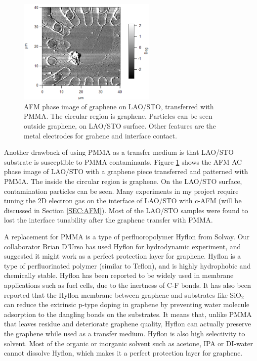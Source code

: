 \documentclass[pdflatex, sectionletters, 12pt]{pittetd}    %
\begin{document}
\begin{figure}[h!]
	\centering
	\includegraphics[width=0.60\textwidth]{Drawing/PMMAResidue.png}
	\caption{AFM phase image of graphene on LAO/STO, transferred with PMMA. The circular region is graphene. Particles can be seen outside graphene, on LAO/STO surface. Other features are the metal electrodes for grahene and interface contact.}
	\label{FIG:PMMAResidue}
\end{figure}

Another drawback of using PMMA as a transfer medium is that LAO/STO substrate is susceptible to PMMA contaminants. Figure \ref{FIG:PMMAResidue} shows the AFM AC phase image of  LAO/STO with a graphene piece transferred and patterned with PMMA. The inside the circular region is graphene. On the LAO/STO surface, contamination particles can be seen. Many experiments in my project require tuning the 2D electron gas on the interface of LAO/STO with c-AFM (will be discussed in Section \ref{SEC:AFM}). Most of the LAO/STO samples were found to lost the interface tunability after the graphene transfer with PMMA. 

A replacement for PMMA is a type of perfluoropolymer Hyflon from Solvay. Our collaborator Brian D'Urso has used Hyflon for hydrodynamic experiment, and suggested it might work as a perfect protection layer for graphene. Hyflon is a type of perfluorinated polymer (similar to Teflon), and is highly hydrophobic and chemically stable. Hyflon has been reported to be widely used in membrane applications such as fuel cells, due to the inertness of C-F bonds\cite{arcella2005hyflon, merlo2007membrane, zhang2012recent}. It has also been reported that the Hyflon membrane between graphene and substrates like SiO$_2$ can reduce the extrinsic p-type doping in graphene by preventing water molecule adsorption to the dangling bonds on the substrates\cite{mattevi2012solution}. It means that, unlike PMMA that leaves residue and deteriorate graphene quality, Hyflon can actually preserve the graphene while used as a transfer medium. Hyflon is also high selectivity to solvent. Most of the organic or inorganic solvent such as acetone, IPA or DI-water cannot dissolve Hyflon, which makes it a perfect protection layer for graphene. 
\end{document}
